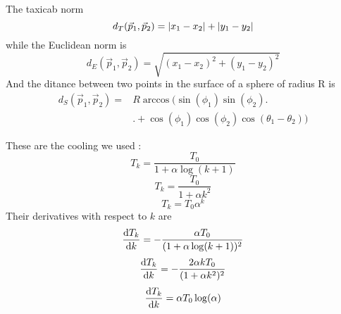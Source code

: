 \documentclass[onecolumn,11pt]{article}
\begin{document}
The taxicab norm
\begin{equation}
d_{T}(\vec{p}_{1},\vec{p}_{2}) = \abs{x_{1}-x_{2}} + \abs{y_{1}-y_{2}}
\end{equation}
while the Euclidean norm is
\begin{equation}
d_{E}(\vec{p}_{1},\vec{p}_{2}) = \sqrt{(x_{1}-x_{2})^{2} + (y_{1}-y_{2})^{2}}
\end{equation}
And the ditance between two points in the surface of a sphere of radius R is
\begin{align}
d_{S}(\vec{p}_{1},\vec{p}_{2}) = &R \arccos \big( \sin(\phi_{1})\sin(\phi_{2})\big. \\
&\big.+ \cos(\phi_{1})\cos(\phi_{2})\cos(\theta_{1}-\theta_{2}) \big)
\end{align}

These are the cooling we used :
\begin{equation}
    T_k = \frac{T_0}{1+\alpha\log(k+1)}
\end{equation}
\begin{equation}
    T_k = \frac{T_0}{1+\alpha k^2}
\end{equation}
\begin{equation}
    T_k = T_0\alpha^k
\end{equation}
Their derivatives with respect to $k$ are
\begin{equation}
    \dv{T_k}{k} = -\frac{\alpha T_0}{(1+\alpha\log(k+1))^2}
\end{equation}
\begin{equation}
    \dv{T_k}{k} = -\frac{2\alpha k T_0}{(1+\alpha k^2)^2}
\end{equation}
\begin{equation}
    \dv{T_k}{k} = \alpha T_0\log(\alpha)
\end{equation}
\end{document}
